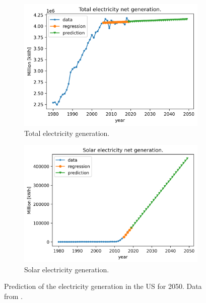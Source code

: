 \documentclass[11pt,letterpaper]{article}
\begin{document}
\begin{figure}[htbp!]
	\centering
	\begin{subfigure}[t]{0.38\textwidth}
		\centering
		\includegraphics[width=\linewidth]{figures/us-prediction1}
		\caption{Total electricity generation.}
	\end{subfigure}
	\begin{subfigure}[t]{0.40\textwidth}
		\centering
		\includegraphics[width=\linewidth]{figures/us-prediction2}
		\caption{Solar electricity generation.}
	\end{subfigure}
	\hfill
	\caption{Prediction of the electricity generation in the \gls{US} for 2050. Data from \cite{us_energy_information_administration_electric_2020}.}
	\label{fig:prediction}
\end{figure}
\end{document}
